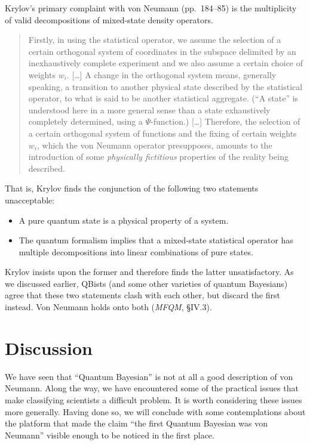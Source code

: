 \documentclass[aps,pra,superscriptaddress,12pt,tightenlines,nofootinbib]{revtex4}
\newcommand{\MFQM}{\textsl{MFQM}}
\begin{document}
Krylov's primary complaint with von Neumann (pp.\ 184--85) is the
multiplicity of valid decompositions of mixed-state density operators.
\begin{quotation}
Firstly, in using the statistical operator, we assume the selection of
a certain orthogonal system of coordinates in the subspace delimited
by an inexhaustively complete experiment and we also assume a certain
choice of weights $w_i$.  [\ldots\!]  A change in the orthogonal
system means, generally speaking, a transition to another physical
state described by the statistical operator, to what is said to be
another statistical aggregate.  (``A state'' is understood here in a
more general sense than a state exhaustively completely determined,
using a $\Psi$-function.)  [\ldots\!]  Therefore, the selection of a
certain orthogonal system of functions and the fixing of certain
weights $w_i$, which the von Neumann operator presupposes, amounts to
the introduction of some {\sl physically fictitious} properties of the
reality being described.
\end{quotation}
That is, Krylov finds the conjunction of the following two statements
unacceptable:
\begin{itemize}
\item A pure quantum state is a physical property of a system.
\item The quantum formalism implies that a mixed-state statistical
  operator has multiple decompositions into linear combinations of
  pure states.
\end{itemize}
Krylov insists upon the former and therefore finds the latter
unsatisfactory.  As we discussed earlier, QBists (and some other
varieties of quantum Bayesians) agree that these two statements clash
with each other, but discard the first instead.  Von Neumann holds
onto both (\MFQM, \S IV.3).

\section{Discussion}

We have seen that ``Quantum Bayesian'' is not at all a good
description of von Neumann.  Along the way, we have encountered some
of the practical issues that make classifying scientists a difficult
problem.  It is worth considering these issues more generally.  Having
done so, we will conclude with some contemplations about the platform
that made the claim ``the first Quantum Bayesian was von Neumann''
visible enough to be noticed in the first place.
\end{document}
